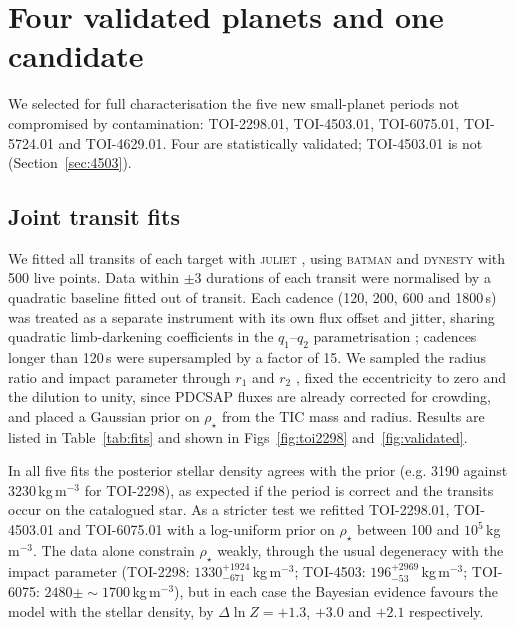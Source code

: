 \documentclass[fleqn,usenatbib]{mnras}
\begin{document}
\section{Four validated planets and one candidate}
\label{sec:planets}

We selected for full characterisation the five new small-planet periods not compromised by contamination: TOI-2298.01, TOI-4503.01, TOI-6075.01, TOI-5724.01 and TOI-4629.01. Four are statistically validated; TOI-4503.01 is not (Section~\ref{sec:4503}).

\subsection{Joint transit fits}
\label{sec:fits}

We fitted all transits of each target with \textsc{juliet} \citep{Espinoza2019}, using \textsc{batman} \citep{Kreidberg2015} and \textsc{dynesty} \citep{Speagle2020} with 500 live points. Data within $\pm3$ durations of each transit were normalised by a quadratic baseline fitted out of transit. Each cadence (120, 200, 600 and 1800\,s) was treated as a separate instrument with its own flux offset and jitter, sharing quadratic limb-darkening coefficients in the $q_1$--$q_2$ parametrisation \citep{Kipping2013}; cadences longer than 120\,s were supersampled by a factor of 15. We sampled the radius ratio and impact parameter through $r_1$ and $r_2$ \citep{Espinoza2018}, fixed the eccentricity to zero and the dilution to unity, since PDCSAP fluxes are already corrected for crowding, and placed a Gaussian prior on $\rho_\star$ from the TIC mass and radius. Results are listed in Table~\ref{tab:fits} and shown in Figs~\ref{fig:toi2298} and~\ref{fig:validated}.

In all five fits the posterior stellar density agrees with the prior (e.g. 3190 against 3230\,kg\,m$^{-3}$ for TOI-2298), as expected if the period is correct and the transits occur on the catalogued star. As a stricter test we refitted TOI-2298.01, TOI-4503.01 and TOI-6075.01 with a log-uniform prior on $\rho_\star$ between 100 and $10^5$\,kg\,m$^{-3}$. The data alone constrain $\rho_\star$ weakly, through the usual degeneracy with the impact parameter (TOI-2298: $1330^{+1924}_{-671}$\,kg\,m$^{-3}$; TOI-4503: $196^{+2969}_{-53}$\,kg\,m$^{-3}$; TOI-6075: $2480 \pm {\sim}1700$\,kg\,m$^{-3}$), but in each case the Bayesian evidence favours the model with the stellar density, by $\Delta\ln Z = +1.3$, $+3.0$ and $+2.1$ respectively.
\end{document}
